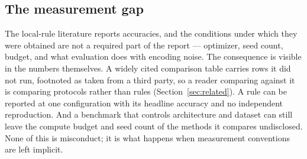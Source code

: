 \documentclass[11pt]{article}
\begin{document}
\subsection{The measurement gap}
The local-rule literature reports accuracies, and the conditions under which
they were obtained are not a required part of the report --- optimizer, seed
count, budget, and what evaluation does with encoding noise. The consequence is
visible in the numbers themselves. A widely cited comparison table carries rows
it did not run, footnoted as taken from a third party, so a reader comparing
against it is comparing protocols rather than rules (Section~\ref{sec:related}).
A rule can be reported at one configuration with its headline accuracy and no
independent reproduction. And a benchmark that controls architecture and dataset
can still leave the compute budget and seed count of the methods it compares
undisclosed. None of this is misconduct; it is what happens when measurement
conventions are left implicit.
\end{document}
